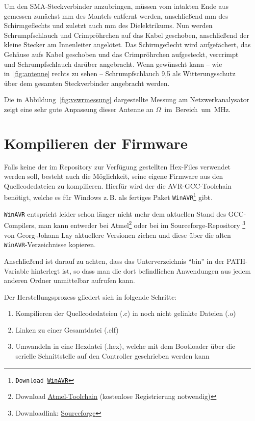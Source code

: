 \documentclass[pdftex, parskip, numbers=noenddot, toc=listof]{scrbook}
\begin{document}
	Um den SMA-Steckverbinder anzubringen, müssen vom intakten Ende aus gemessen zunächst \unit[12]{mm} des Mantels entfernt werden, anschließend \unit[8]{mm} des Schirmgeflechts und zuletzt auch \unit[4]{mm} des Dielektrikums. Nun werden Schrumpfschlauch und Crimpröhrchen auf das Kabel geschoben, anschließend der kleine Stecker am Innenleiter angelötet. Das Schirmgeflecht wird aufgefächert, das Gehäuse aufs Kabel geschoben und das Crimpröhrchen aufgesteckt, vercrimpt und Schrumpfschlauch darüber angebracht. Wenn gewünscht kann -- wie in~\ref{fig:antenne} rechts zu sehen -- Schrumpfschlauch 9{,}5 als Witterungsschutz über dem gesamten Steckverbinder angebracht werden.

	Die in Abbildung~\ref{fig:vswrmessung} dargestellte Messung am Netzwerkanalysator zeigt eine sehr gute Anpassung dieser Antenne an \unit[50]{$\Omega$} im Bereich um \unit[868]{MHz}.



	\section{Kompilieren der Firmware}

	Falls keine der im Repository zur Verfügung gestellten Hex-Files verwendet werden soll, besteht auch die Möglichkeit, seine eigene Firmware aus den Quellcodedateien zu kompilieren. Hierfür wird der die AVR-GCC-Toolchain benötigt, welche es für Windows z.\,B. als fertiges Paket \texttt{WinAVR\footnote{Download \href{http://sourceforge.net/projects/winavr/files/}{WinAVR}}} gibt.

	\texttt{WinAVR} entspricht leider schon länger nicht mehr dem aktuellen Stand des GCC-Compilers, man kann entweder bei Atmel\footnote{Download \href{http://www.atmel.com/tools/ATMELAVRTOOLCHAINFORWINDOWS.aspx}{Atmel-Toolchain} (kostenlose Registrierung notwendig)} oder bei im Sourceforge-Repository%
	\footnote{Downloadlink: \href{http://sourceforge.net/projects/mobilechessboar/files}{Sourceforge}} von Georg-Johann Lay aktuellere Versionen ziehen und diese über die alten \texttt{WinAVR}-Verzeichnisse kopieren.

	Anschließend ist darauf zu achten, dass das Unterverzeichnis \enquote{bin} in der PATH-Variable hinterlegt ist, so dass man die dort befindlichen Anwendungen aus jedem anderen Ordner unmittelbar aufrufen kann.

	Der Herstellungsprozess gliedert sich in folgende Schritte:
	\begin{enumerate}
		\item Kompilieren der Quellcodedateien (.c) in noch nicht gelinkte Dateien (.o)
		\item Linken zu einer Gesamtdatei (.elf)
		\item Umwandeln in eine Hexdatei (.hex), welche mit dem Bootloader über die serielle Schnittstelle auf den Controller geschrieben werden kann
	\end{enumerate}
\end{document}
